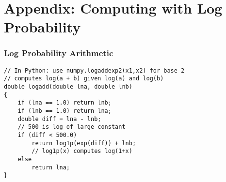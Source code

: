 \section*{Appendix: Computing with Log Probability}

\begin{frame}[fragile]
\frametitle{Log Probability Arithmetic}
\begin{center}
\begin{verbatim}
// In Python: use numpy.logaddexp2(x1,x2) for base 2
// computes log(a + b) given log(a) and log(b)
double logadd(double lna, double lnb)
{
    if (lna == 1.0) return lnb;
    if (lnb == 1.0) return lna;
    double diff = lna - lnb;
    // 500 is log of large constant
    if (diff < 500.0) 
        return log1p(exp(diff)) + lnb;
        // log1p(x) computes log(1+x)
    else
        return lna;
}
\end{verbatim} 
\end{center}
\end{frame}






